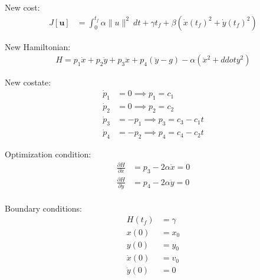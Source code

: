 \documentclass[11pt]{article}
\begin{document}
New cost:
\begin{align*}
    J[\mathbf{u}] &= \int_{0}^{t_f} \alpha \|u\|^2\ dt + \gamma t_f + \beta\left(\dot{x}(t_f)^2 + \dot{y}(t_f)^2\right)
\end{align*}

New Hamiltonian:
\begin{align*}
    H = p_1 \dot{x} + p_2 \dot{y} + p_3 \ddot{x} + p_4 (\ddot{y} - g) - \alpha\left(\ddot{x}^2 + ddot{y}^2\right)
\end{align*}

New costate:
\begin{align*}
    \dot{p}_1 &= 0 \implies p_1 = c_1 \\
    \dot{p}_2 &= 0 \implies p_2 = c_2 \\
    \dot{p}_3 &= -p_1 \implies p_3 = c_3 - c_1 t \\
    \dot{p}_4 &= -p_2 \implies p_4 = c_4 - c_2 t
\end{align*}

Optimization condition:
\begin{align*}
    \frac{\partial H}{\partial \ddot{x}} &= p_3 - 2\alpha \ddot{x} = 0 \\
    \frac{\partial H}{\partial \ddot{y}} &= p_4 - 2\alpha \ddot{y} = 0 \\
\end{align*}

Boundary conditions:
\begin{align*}
    H(t_f) &= \gamma \\
    x(0) &= x_0 \\
    y(0) &= y_0 \\
    \dot{x}(0) &= v_0 \\
    \dot{y}(0) &= 0 \\
\end{align*}
\pagebreak
\end{document}
